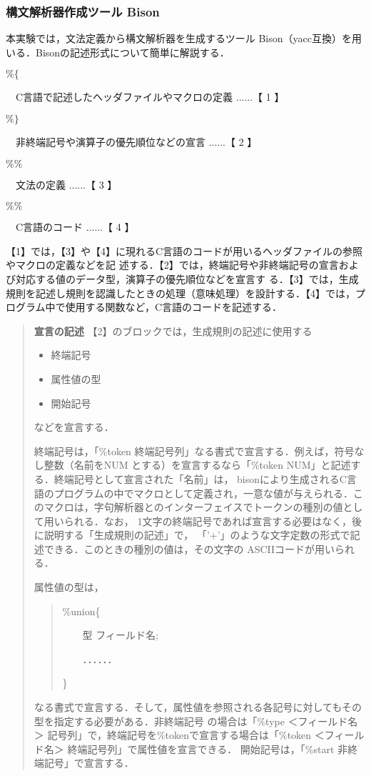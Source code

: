 \documentclass[a4j]{jsarticle}  %
\begin{document}
\subsubsection{構文解析器作成ツール Bison}
本実験では，文法定義から構文解析器を生成するツール
Bison（yacc互換）を用いる．Bisonの記述形式について簡単に解説する．
\begin{shadebox}
$\%\{$
 
\ \ C言語で記述したヘッダファイルやマクロの定義 ......【 1 】

$\%\}$

\ \ 非終端記号や演算子の優先順位などの宣言 ......【 2 】

$\%\%$

\ \ 文法の定義 ......【 3 】

$\%\%$

\ \ C言語のコード ......【 4 】
\end{shadebox}

【1】では，【3】や【4】に現れるC言語のコードが用いるヘッダファイルの参照やマクロの定義などを記
述する．【2】では，終端記号や非終端記号の宣言および対応する値のデータ型，演算子の優先順位などを宣言す
る．【3】では，生成規則を記述し規則を認識したときの処理（意味処理）を設計する．【4】では，プログラム中で使用する関数など，C言語のコードを記述する．

\begin{quote}
{\bf 宣言の記述} 【2】のブロックでは，生成規則の記述に使用する
\begin{itemize}
\item 終端記号
\item 属性値の型
\item 開始記号
\end{itemize}
などを宣言する．

終端記号は，「\%token 終端記号列」なる書式で宣言する．例えば，符号なし整数（名前をNUM
とする）を宣言するなら「\%token NUM」と記述する．終端記号として宣言された「名前」は，
bisonにより生成されるC言語のプログラムの中でマクロとして定義され，一意な値が与えられる．このマクロは，字句解析器とのインターフェイスでトークンの種別の値として用いられる．なお，
1文字の終端記号であれば宣言する必要はなく，後に説明する「生成規則の記述」で，
「'+'」のような文字定数の形式で記述できる．このときの種別の値は，その文字の
ASCIIコードが用いられる．

属性値の型は，
\begin{quote}
\%union\{

\ \ \ \ 型 フィールド名;

\ \ \ \ ．．．．．．

\}
\end{quote}
なる書式で宣言する．そして，属性値を参照される各記号に対してもその型を指定する必要がある．非終端記号
の場合は「\%type ＜フィールド名＞ 記号列」で，終端記号を\%tokenで宣言する場合は「\%token ＜フィールド名＞ 終端記号列」で属性値を宣言できる．
開始記号は，「\%start 非終端記号」で宣言する．
\end{quote}
\end{document}
